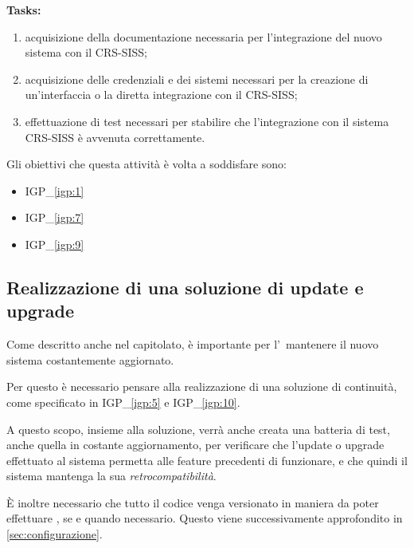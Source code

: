 		\textbf{Tasks:}
		\begin{enumerate}[noitemsep]
			\item acquisizione della documentazione necessaria per l'integrazione del nuovo sistema con il CRS-SISS;
			\item acquisizione delle credenziali e dei sistemi necessari per la creazione di un'interfaccia o la diretta integrazione con il CRS-SISS;
			\item effettuazione di test necessari per stabilire che l'integrazione con il sistema CRS-SISS è avvenuta correttamente.
		\end{enumerate}
	
		Gli obiettivi che questa attività è volta a soddisfare sono:
		\begin{itemize}[noitemsep]
			\renewcommand\labelitemi{--}
			\item {\color{pantone}IGP\_\ref{igp:1}}
			\item {\color{pantone}IGP\_\ref{igp:7}}
			\item {\color{pantone}IGP\_\ref{igp:9}}
		\end{itemize}	

	\newpage
	\subsection{Realizzazione di una soluzione di update e upgrade}
		
		Come descritto anche nel capitolato, è importante per l'\istituto~mantenere il nuovo sistema costantemente aggiornato.
		
		Per questo è necessario pensare alla realizzazione di una soluzione di continuità, come specificato in {\color{pantone}IGP\_\ref{igp:5}} e {\color{pantone}IGP\_\ref{igp:10}}.
		
		A questo scopo, insieme alla soluzione, verrà anche creata una batteria di test, anche quella in costante aggiornamento, per verificare che l'update o upgrade effettuato al sistema permetta alle feature precedenti di funzionare, e che quindi il sistema mantenga la sua \textit{retrocompatibilità}.
		
		È inoltre necessario che tutto il codice venga versionato in maniera da poter effettuare \rollback, se e quando necessario.
		Questo viene successivamente approfondito in \ref{sec:configurazione}.
		
